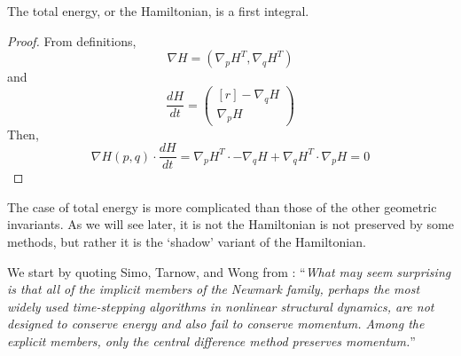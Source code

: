 \documentclass[../Main.tex]{subfiles}
\begin{document}
\begin{theorem} The total energy, or the Hamiltonian, is a first integral. \end{theorem}
\begin{proof}
From definitions,
$$
	\nabla H = \left(\nabla_{p}H^{T}, \nabla_{q}H^{T}\right)
$$
and
$$
	\frac{dH}{dt} =
		\begin{pmatrix*}[r]
			-\nabla_{q}H \\
			\nabla_{p}H
		\end{pmatrix*}
$$
Then, 
$$
\nabla H(p, q) \cdot \frac{dH}{dt} = \nabla_{p}H^{T}\cdot-\nabla_{q}H + \nabla_{q}H^{T}\cdot \nabla_{p}H = 0
$$ 
\end{proof} 

The case of total energy is more complicated than those of the other geometric invariants. As we will see later, it is not the Hamiltonian is not preserved by some methods, but rather it is the `shadow' variant of the Hamiltonian.

We start by quoting Simo, Tarnow, and Wong from \cite{SimoTarnowWong1992}:
``\textit{What may seem surprising is that all of the implicit members of the Newmark family, perhaps the most widely used time-stepping algorithms in nonlinear structural dynamics, are not designed to conserve energy and also fail to conserve momentum. Among the explicit members, only the central difference method preserves momentum.}''	
\end{document}
